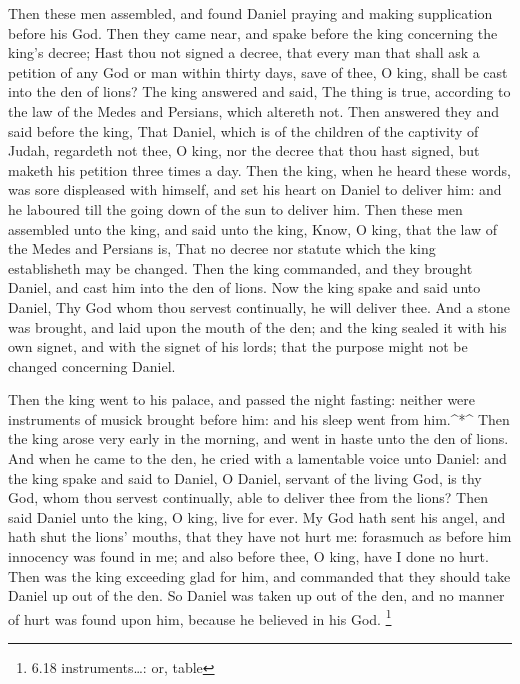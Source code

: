  Then these men assembled, and found Daniel praying and
making supplication before his God.  Then they came near,
and spake before the king concerning the king's decree; Hast thou not
signed a decree, that every man that shall ask a petition of any God or
man within thirty days, save of thee, O king, shall be cast into the den
of lions? The king answered and said, The thing is true, according to
the law of the Medes and Persians, which altereth not. 
Then answered they and said before the king, That Daniel, which is of
the children of the captivity of Judah, regardeth not thee, O king, nor
the decree that thou hast signed, but maketh his petition three times a
day.  Then the king, when he heard these words, was sore
displeased with himself, and set his heart on Daniel to deliver him: and
he laboured till the going down of the sun to deliver him. 
Then these men assembled unto the king, and said unto the king, Know, O
king, that the law of the Medes and Persians is, That no decree nor
statute which the king establisheth may be changed.  Then
the king commanded, and they brought Daniel, and cast him into the den
of lions. Now the king spake and said unto Daniel, Thy God whom thou
servest continually, he will deliver thee.  And a stone was
brought, and laid upon the mouth of the den; and the king sealed it with
his own signet, and with the signet of his lords; that the purpose might
not be changed concerning Daniel.

 Then the king went to his palace, and passed the night
fasting: neither were instruments of musick brought before him: and his
sleep went from him.\^{}*\^{}  Then the king arose very
early in the morning, and went in haste unto the den of lions.
 And when he came to the den, he cried with a lamentable
voice unto Daniel: and the king spake and said to Daniel, O Daniel,
servant of the living God, is thy God, whom thou servest continually,
able to deliver thee from the lions?  Then said Daniel unto
the king, O king, live for ever.  My God hath sent his
angel, and hath shut the lions' mouths, that they have not hurt me:
forasmuch as before him innocency was found in me; and also before thee,
O king, have I done no hurt.  Then was the king exceeding
glad for him, and commanded that they should take Daniel up out of the
den. So Daniel was taken up out of the den, and no manner of hurt was
found upon him, because he believed in his God. \footnote{6.18
  instruments\ldots: or, table}

